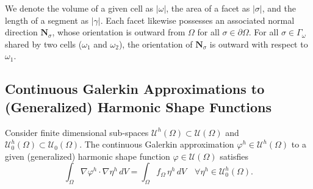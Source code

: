 	We denote the volume of a given cell as $|\omega|$, the area of a facet as $|\sigma|$, and the length of a segment as $|\gamma|$. Each facet likewise possesses an associated normal direction $\mathbf{N}_\sigma$, whose orientation is outward from $\Omega$ for all $\sigma \in \partial \Omega$. For all $\sigma \in \Gamma_\omega$ shared by two cells ($\omega_1$ and $\omega_2$), the orientation of $\mathbf{N}_\sigma$ is outward with respect to $\omega_1$.
	
\subsection*{Continuous Galerkin Approximations to \\ (Generalized) Harmonic Shape Functions}

	Consider finite dimensional sub-spaces $\mathcal{U}^h (\Omega) \subset \mathcal{U} (\Omega)$ and $\mathcal{U}^h_0 (\Omega) \subset \mathcal{U}_0 (\Omega)$. The continuous Galerkin approximation $\varphi^h \in \mathcal{U}^h (\Omega)$ to a given (generalized) harmonic shape function $\varphi \in \mathcal{U} (\Omega)$ satisfies
	\begin{equation}
		\int_\Omega \nabla \varphi^h \cdot \nabla \eta^h \, dV = \int_\Omega f_{\Omega} \, \eta^h \, dV \quad \forall \eta^h \in \mathcal{U}^h_0 (\Omega).
		\label{eq:weak_poisson}
	\end{equation}

